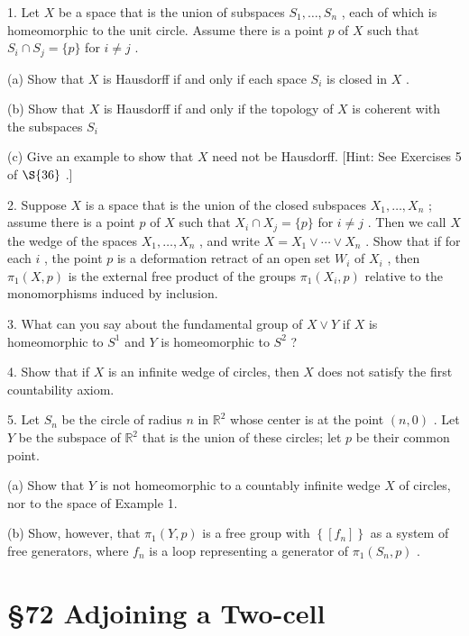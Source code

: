 1. Let \(X\) be a space that is the union of subspaces \({S}_{1},\ldots ,{S}_{n}\) , each of which is homeomorphic to the unit circle. Assume there is a point \(p\) of \(X\) such that \({S}_{i} \cap  {S}_{j} = \{ p\}\) for \(i \neq  j\) .

(a) Show that \(X\) is Hausdorff if and only if each space \({S}_{i}\) is closed in \(X\) .

(b) Show that \(X\) is Hausdorff if and only if the topology of \(X\) is coherent with the subspaces \({S}_{i}\)

(c) Give an example to show that \(X\) need not be Hausdorff. [Hint: See Exercises 5 of \( \S {36}\) .]

2. Suppose \(X\) is a space that is the union of the closed subspaces \({X}_{1},\ldots ,{X}_{n}\) ; assume there is a point \(p\) of \(X\) such that \({X}_{i} \cap  {X}_{j} = \{ p\}\) for \(i \neq  j\) . Then we call \(X\) the wedge of the spaces \({X}_{1},\ldots ,{X}_{n}\) , and write \(X = {X}_{1} \vee  \cdots  \vee  {X}_{n}\) . Show that if for each \(i\) , the point \(p\) is a deformation retract of an open set \({W}_{i}\) of \({X}_{i}\) , then \({\pi }_{1}\left( {X,p}\right)\) is the external free product of the groups \({\pi }_{1}\left( {{X}_{i},p}\right)\) relative to the monomorphisms induced by inclusion.

3. What can you say about the fundamental group of \(X \vee  Y\) if \(X\) is homeomorphic to \({S}^{1}\) and \(Y\) is homeomorphic to \({S}^{2}\) ?

4. Show that if \(X\) is an infinite wedge of circles, then \(X\) does not satisfy the first countability axiom.

5. Let \({S}_{n}\) be the circle of radius \(n\) in \({\mathbb{R}}^{2}\) whose center is at the point \(\left( {n,0}\right)\) . Let \(Y\) be the subspace of \({\mathbb{R}}^{2}\) that is the union of these circles; let \(p\) be their common point.

(a) Show that \(Y\) is not homeomorphic to a countably infinite wedge \(X\) of circles, nor to the space of Example 1.

(b) Show, however, that \({\pi }_{1}\left( {Y,p}\right)\) is a free group with \(\left\{  \left\lbrack  {f}_{n}\right\rbrack  \right\}\) as a system of free generators, where \({f}_{n}\) is a loop representing a generator of \({\pi }_{1}\left( {{S}_{n},p}\right)\) .

\section*{ \S 72 Adjoining a Two-cell}

